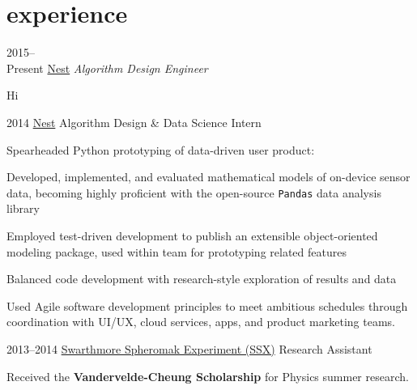 \documentclass[]{friggeri-cv}
\begin{document}
\section{experience}

\begin{entrylist}
  \entry
    {2015--\\Present}
    {\href{http://nest.com}{Nest}}
    {\emph{Algorithm Design Engineer}}
    {
      \vspace{-6pt}
      \begin{my-itemize}
      \item Hi
      \end{my-itemize}
    }
  \entry
    {2014}
    {\href{http://nest.com}{Nest}}
    {Algorithm Design \& Data Science Intern}
    {
      \vspace{-6pt}
      \begin{my-itemize}
      \item Spearheaded Python prototyping of data-driven user product:

      \begin{my-itemize}
      \item Developed, implemented, and evaluated mathematical models of on-device sensor data, becoming highly proficient with the open-source \texttt{Pandas} data analysis library
      \item Employed test-driven development to publish an extensible object-oriented modeling package, used within team for prototyping related features
      \item Balanced code development with research-style exploration of results and data
      \end{my-itemize}

      \item Used Agile software development principles to meet ambitious schedules through coordination with UI/UX, cloud services, apps, and product marketing teams.
      \end{my-itemize}
    }
  \entry
    {2013--2014} %
    {\href{http://www.swarthmore.edu/ssx-lab}{Swarthmore Spheromak Experiment (SSX)}}
    {Research Assistant}
    {
      \vspace{-6pt}
      \begin{my-itemize}
      \item Received the \textbf{Vandervelde-Cheung Scholarship} for Physics summer research.


\end{my-itemize}}
\end{entrylist}
\end{document}
